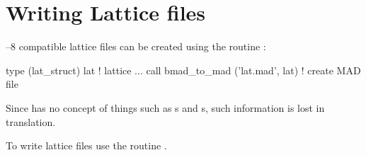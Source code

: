 \section{Writing Lattice files}

\mad--8 compatible lattice files can be created using the routine :
\begin{example}
  type (lat_struct) lat             ! lattice
  ...
  call bmad_to_mad ('lat.mad', lat)  ! create MAD file
\end{example}
Since \mad has no concept of things such as s and s, such 
information is lost in translation.

To write \bmad lattice files use the routine .

